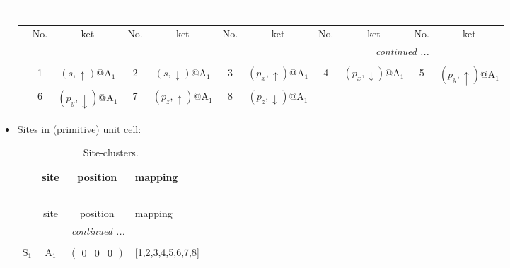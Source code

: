 \documentclass[fleqn,10pt,landscape]{article}
\begin{document}
\begin{itemize}
\begin{center}
\begin{longtable}{c|cc|cc|cc|cc|cc}
\multicolumn{10}{l}{\tablename\ \thetable{}} \\
 \hline \hline
 & No. & ket & No. & ket & No. & ket & No. & ket & No. & ket \\ \hline \endhead

 \hline \hline
\multicolumn{10}{r}{\footnotesize\it continued ...} \\ \endfoot

 \hline \hline
\multicolumn{10}{r}{} \\ \endlastfoot

 & 1 & $(s,\uparrow)$@A$_{1}$ & 2 & $(s,\downarrow)$@A$_{1}$ & 3 & $(p_{x},\uparrow)$@A$_{1}$ & 4 & $(p_{x},\downarrow)$@A$_{1}$ & 5 & $(p_{y},\uparrow)$@A$_{1}$ \\
& 6 & $(p_{y},\downarrow)$@A$_{1}$ & 7 & $(p_{z},\uparrow)$@A$_{1}$ & 8 & $(p_{z},\downarrow)$@A$_{1}$ &  &  &  &  \\
\end{longtable}
\end{center}

\item Sites in (primitive) unit cell:
\begin{center}
\renewcommand{\arraystretch}{1.3}
\begin{longtable}{cc|c|l}
\caption{Site-clusters.}
 \\
 \hline \hline
 & site & position & mapping \\ \hline \endfirsthead

\multicolumn{3}{l}{\tablename\ \thetable{}} \\
 \hline \hline
 & site & position & mapping \\ \hline \endhead

 \hline \hline
\multicolumn{3}{r}{\footnotesize\it continued ...} \\ \endfoot

 \hline \hline
\multicolumn{3}{r}{} \\ \endlastfoot

S$_{1}$ & A$_1$ & $\begin{pmatrix} 0 & 0 & 0 \end{pmatrix}$ & [1,2,3,4,5,6,7,8] \\
\end{longtable}
\end{center}


\end{itemize}
\end{document}
